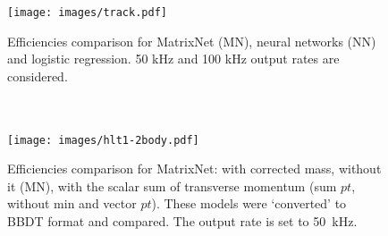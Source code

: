 \documentclass{llncs}
\begin{document}
\begin{figure}[h]
\begin{minipage}{18pc}
\texttt{[image: images/track.pdf]}
\caption{\label{hlt1_res} Efficiencies comparison for MatrixNet (MN), neural networks (NN) and logistic regression. 50 kHz and 100 kHz output rates are considered. \\ \\ \\ }
\end{minipage}\hspace{2pc}%
\begin{minipage}{18pc}
\texttt{[image: images/hlt1-2body.pdf]}
\caption{\label{hlt12_res} Efficiencies comparison for MatrixNet: with corrected mass, without it (MN), with the scalar sum of transverse momentum (sum $pt$, without min and vector $pt$). These models were `converted' to BBDT format and compared. The output rate is set to 50~kHz.}
\end{minipage} 
\end{figure}
\end{document}
